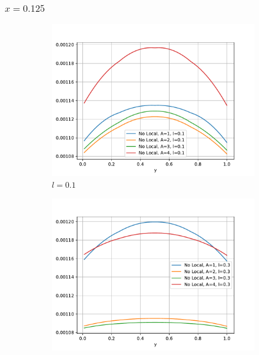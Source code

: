 	\subsubsection{\texorpdfstring{$x=0.125$}{y=0.125}}

		\begin{figure}
		    \centering
		    \sffamily
		    \begin{subfigure}{0.48\textwidth}
		    \centering
		        \includegraphics[width=\textwidth]{figuras/Barra/Perfiles/X/X0.1_0.125.pdf}
		        \caption{$l=0.1$}
		        \label{fig:perfilesbarraX0125.01}
		    \end{subfigure}
		    \begin{subfigure}{0.48\textwidth}
		    \centering
		        \includegraphics[width=\textwidth]{figuras/Barra/Perfiles/X/X0.3_0.125.pdf}

\end{subfigure}
\end{figure}
